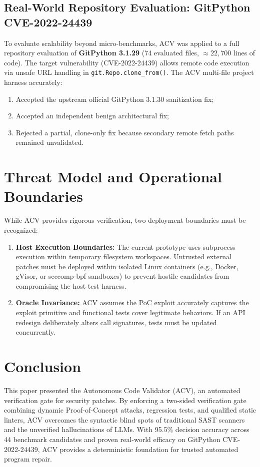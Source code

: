 \documentclass[conference]{IEEEtran}
\begin{document}
\subsection{Real-World Repository Evaluation: GitPython CVE-2022-24439}
To evaluate scalability beyond micro-benchmarks, ACV was applied to a full repository evaluation of \textbf{GitPython 3.1.29} (74 evaluated files, $\approx 22,700$ lines of code). The target vulnerability (CVE-2022-24439) allows remote code execution via unsafe URL handling in \texttt{git.Repo.clone\_from()}. 
The ACV multi-file project harness accurately:
\begin{enumerate}
    \item Accepted the upstream official GitPython 3.1.30 sanitization fix;
    \item Accepted an independent benign architectural fix;
    \item Rejected a partial, clone-only fix because secondary remote fetch paths remained unvalidated.
\end{enumerate}

\section{Threat Model and Operational Boundaries}
While ACV provides rigorous verification, two deployment boundaries must be recognized:
\begin{enumerate}
    \item \textbf{Host Execution Boundaries:} The current prototype uses subprocess execution within temporary filesystem workspaces. Untrusted external patches must be deployed within isolated Linux containers (e.g., Docker, gVisor, or seccomp-bpf sandboxes) to prevent hostile candidates from compromising the host test harness.
    \item \textbf{Oracle Invariance:} ACV assumes the PoC exploit accurately captures the exploit primitive and functional tests cover legitimate behaviors. If an API redesign deliberately alters call signatures, tests must be updated concurrently.
\end{enumerate}

\section{Conclusion}
This paper presented the Autonomous Code Validator (ACV), an automated verification gate for security patches. By enforcing a two-sided verification gate combining dynamic Proof-of-Concept attacks, regression tests, and qualified static linters, ACV overcomes the syntactic blind spots of traditional SAST scanners and the unverified hallucinations of LLMs. With 95.5\% decision accuracy across 44 benchmark candidates and proven real-world efficacy on GitPython CVE-2022-24439, ACV provides a deterministic foundation for trusted automated program repair.
\end{document}
